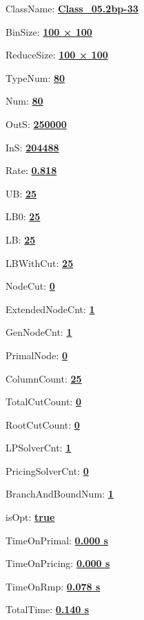 \documentclass[11pt]{article}
\begin{document}
\pagestyle{empty}


ClassName: \underline{\textbf{Class_05.2bp-33}}
\par
BinSize: \underline{\textbf{100 × 100}}
\par
ReduceSize: \underline{\textbf{100 × 100}}
\par
TypeNum: \underline{\textbf{80}}
\par
Num: \underline{\textbf{80}}
\par
OutS: \underline{\textbf{250000}}
\par
InS: \underline{\textbf{204488}}
\par
Rate: \underline{\textbf{0.818}}
\par
UB: \underline{\textbf{25}}
\par
LB0: \underline{\textbf{25}}
\par
LB: \underline{\textbf{25}}
\par
LBWithCut: \underline{\textbf{25}}
\par
NodeCut: \underline{\textbf{0}}
\par
ExtendedNodeCnt: \underline{\textbf{1}}
\par
GenNodeCnt: \underline{\textbf{1}}
\par
PrimalNode: \underline{\textbf{0}}
\par
ColumnCount: \underline{\textbf{25}}
\par
TotalCutCount: \underline{\textbf{0}}
\par
RootCutCount: \underline{\textbf{0}}
\par
LPSolverCnt: \underline{\textbf{1}}
\par
PricingSolverCnt: \underline{\textbf{0}}
\par
BranchAndBoundNum: \underline{\textbf{1}}
\par
isOpt: \underline{\textbf{true}}
\par
TimeOnPrimal: \underline{\textbf{0.000 s}}
\par
TimeOnPricing: \underline{\textbf{0.000 s}}
\par
TimeOnRmp: \underline{\textbf{0.078 s}}
\par
TotalTime: \underline{\textbf{0.140 s}}
\par
\newpage


\end{document}
